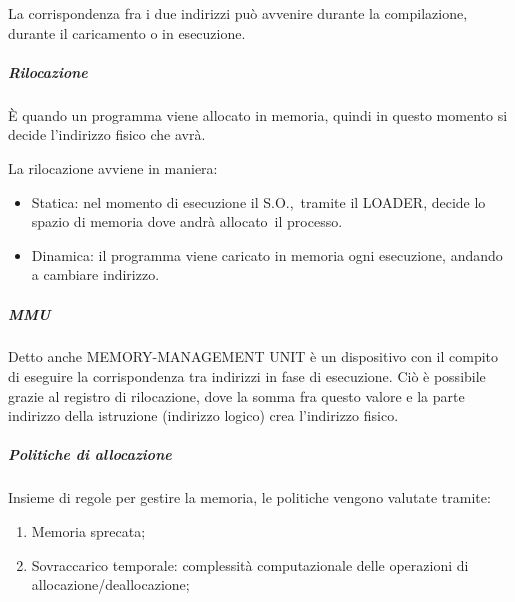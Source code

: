 \documentclass[
]{article}
\providecommand{\tightlist}{%
  \setlength{\itemsep}{0pt}\setlength{\parskip}{0pt}}
\begin{document}
{La corrispondenza fra i due indirizzi può avvenire durante la
compilazione, durante il caricamento o in esecuzione.}

{}

\subparagraph{\texorpdfstring{{Rilocazione}}{Rilocazione}}\label{h.nrnm5g4tytg}

{È quando un programma viene allocato in memoria, quindi in questo
momento si decide l'indirizzo fisico che avrà.}

{La rilocazione avviene in maniera:}

{}

\begin{itemize}
\tightlist
\item
  {Statica: nel momento di esecuzione il }{S.O.,}{~tramite il LOADER,
  decide lo spazio di memoria dove andrà }{allocato}{~il processo.}
\end{itemize}

{}

\begin{itemize}
\tightlist
\item
  {Dinamica: il programma viene caricato in memoria ogni esecuzione,
  andando a cambiare indirizzo.}
\end{itemize}

{}

\subparagraph{\texorpdfstring{{MMU}}{MMU}}\label{h.xs4eotz5zb8q}

{Detto anche MEMORY-MANAGEMENT UNIT è un dispositivo con il compito di
eseguire la corrispondenza tra indirizzi in fase di esecuzione. Ciò è
possibile grazie al registro di rilocazione, dove la somma fra questo
valore e la parte indirizzo della istruzione (indirizzo logico) crea
l'indirizzo fisico.}

{}

\subparagraph{\texorpdfstring{{Politiche di
allocazione}}{Politiche di allocazione}}\label{h.a1dzw1nb6mcj}

{Insieme di regole per gestire la memoria, le politiche vengono valutate
tramite:}

{}

\begin{enumerate}
\tightlist
\item
  {Memoria sprecata;}
\end{enumerate}

{}

\begin{enumerate}
\setcounter{enumi}{1}
\tightlist
\item
  {Sovraccarico temporale: complessità computazionale delle operazioni
  di allocazione/deallocazione;}
\end{enumerate}
\end{document}
